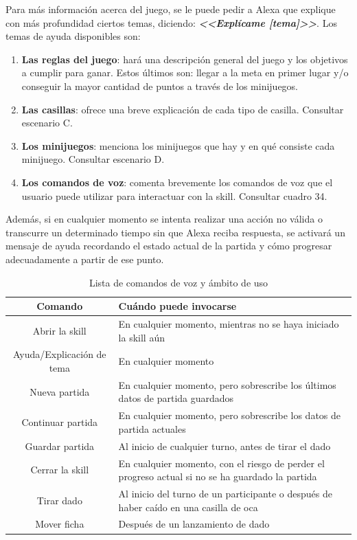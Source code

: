 Para más información acerca del juego, se le puede pedir a Alexa que explique con más profundidad ciertos temas, diciendo: \textbf{\textit{<<Explícame [tema]>>}}. Los temas de ayuda disponibles son: 
\begin{enumerate}
	\item \textbf{Las reglas del juego}: hará una descripción general del juego y los objetivos a cumplir para ganar. Estos últimos son: llegar a la meta en primer lugar y/o conseguir la mayor cantidad de puntos a través de los minijuegos.
	\item \textbf{Las casillas}: ofrece una breve explicación de cada tipo de casilla. Consultar escenario C.
	\item \textbf{Los minijuegos}: menciona los minijuegos que hay y en qué consiste cada minijuego. Consultar escenario D.
	\item \textbf{Los comandos de voz}: comenta brevemente los comandos de voz que el usuario puede utilizar para interactuar con la skill. Consultar cuadro 34.
\end{enumerate}

Además, si en cualquier momento se intenta realizar una acción no válida o transcurre un determinado tiempo sin que Alexa reciba respuesta, se activará un mensaje de ayuda recordando el estado actual de la partida y cómo progresar adecuadamente a partir de ese punto.

\begin{table}[H]
	\centering
	\begin{tabular}{|c|p{8.5cm}|}
		\hline
		\rowcolor{lightgray}
		\textbf{Comando} & \textbf{Cuándo puede invocarse}\\
		\hline
		Abrir la skill & En cualquier momento, mientras no se haya iniciado la skill aún \\
		\hline
		Ayuda/Explicación de tema & En cualquier momento \\
		\hline
		Nueva partida & En cualquier momento, pero sobrescribe los últimos datos de partida guardados \\
		\hline
		Continuar partida & En cualquier momento, pero sobrescribe los datos de partida actuales \\
		\hline
		Guardar partida & Al inicio de cualquier turno, antes de tirar el dado \\
		\hline
		Cerrar la skill & En cualquier momento, con el riesgo de perder el progreso actual si no se ha guardado la partida \\
		\hline
		Tirar dado & Al inicio del turno de un participante o después de haber caído en una casilla de oca \\
		\hline
		Mover ficha & Después de un lanzamiento de dado \\
		\hline
	\end{tabular}
	\caption{Lista de comandos de voz y ámbito de uso}
	\label{tab:comandos-voz}
\end{table}

